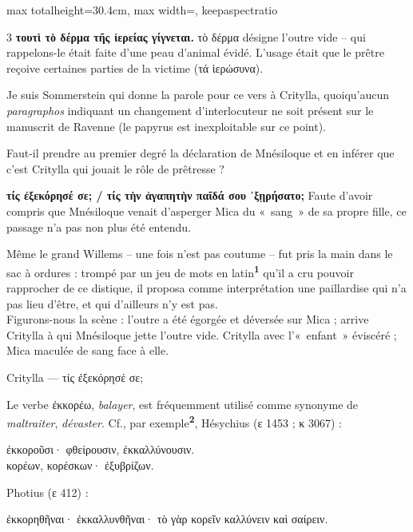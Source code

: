 \documentclass[11pt,twoside]{book}
\newcommand{\italique}[1]{\textit{#1}}
\newcommand{\citComm}[1]{\begin{quoting}[vskip=0.4pt,leftmargin=0.7em,rightmargin=0.2em]#1\end{quoting}}
\newcommand{\grec}[1]{{\policeGr #1}}
\newcommand{\marqueur}[1]{\textsuperscript{\color{rubricRed}\textbf{#1}}}
\begin{document}
\begin{adjustbox}{max totalheight=30.4cm, max width=\textwidth, keepaspectratio}
\begin{minipage}{\textwidth}
{\begin{multicols}{3}
 \textbf{τουτὶ τὸ δέρμα τῆς ἱερείας γίγνεται.} τὸ δέρμα désigne l'outre vide – qui rappelons-le était faite d'une peau d'animal évidé. L'usage était que le prêtre reçoive certaines parties de la victime (\grec{τά ἱερώσυνα}).
\par\vspace{1.5pt}
 \textbf{} Je suis Sommerstein qui donne la parole pour ce vers à Critylla, quoiqu'aucun \italique{paragraphos} indiquant un changement d'interlocuteur ne soit présent sur le manuscrit de Ravenne (le papyrus est inexploitable sur ce point).
\par\vspace{1.5pt}
\noindent Faut-il prendre au premier degré la déclaration de Mnésiloque et en inférer que c'est Critylla qui jouait le rôle de prêtresse ?
\par\vspace{1.5pt}
 \textbf{τίς ἐξεκόρησέ σε; / τίς τὴν ἀγαπητὴν παῖδά σου ᾿ξῃρήσατο;} Faute d'avoir compris que Mnésiloque venait d'asperger Mica du «~sang~» de sa propre fille, ce passage n'a pas non plus été entendu.
\par\vspace{1.5pt}
\noindent Même le grand Willems -- une fois n'est pas coutume -- fut pris la main dans le sac à ordures : trompé par un jeu de mots en latin\marqueur{1} qu'il a cru pouvoir rapprocher de ce distique, il proposa comme interprétation une paillardise qui n'a pas lieu d'être, et qui d'ailleurs n'y est pas.\\ Figurons-nous la scène : l'outre a été égorgée et déversée sur Mica ; arrive Critylla à qui Mnésiloque jette l'outre vide. Critylla avec l'«~enfant~» éviscéré ; Mica maculée de sang face à elle.
\citComm{Critylla --- τίς ἐξεκόρησέ σε;}
\par\vspace{1.5pt}
\noindent Le verbe ἐκκορέω, \italique{balayer}, est fréquemment utilisé comme synonyme de \italique{maltraiter}, \italique{dévaster}. Cf., par exemple\marqueur{2}, Hésychius (ε 1453 ; κ 3067) :
\citComm{ἐκκοροῦσι· φθείρουσιν, ἐκκαλλύνουσιν.\\
κορέων, κορέσκων· ἐξυβρίζων.}
\par\vspace{1.5pt}
\noindent Photius (ε 412) :
\citComm{ἐκκορηθῆναι· ἐκκαλλυνθῆναι· τὸ γὰρ κορεῖν καλλύνειν καὶ σαίρειν.}
\par\vspace{1.5pt}

\end{multicols}}
\end{minipage}
\end{adjustbox}
\end{document}
